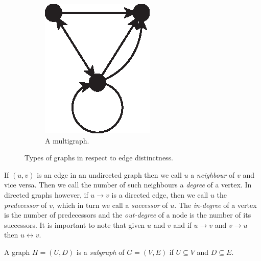 \begin{figure}[H]
\begin{subfigure}[b]{0.25\textwidth}
            \includegraphics[width=\textwidth]{chapters/02_problem_definition/graph_multi}
            \caption{A multigraph.}
            \label{fig:graphs_orientation_directed}
          \end{subfigure}
        \caption{Types of graphs in respect to edge distinctness.}
        \label{fig:graphs_orientation}
      \end{figure}

      If $(u, v)$ is an edge in an undirected graph then we call $u$ a \emph{neighbour} of $v$ and vice versa. Then we call the number of such neighbours a \emph{degree} of a vertex. In directed graphs however, if $u \rightarrow v$ is a directed edge, then we call $u$ the \emph{predecessor} of $v$, which in turn we call a \emph{successor} of $u$. The \emph{in-degree} of a vertex is the number of predecessors and the \emph{out-degree} of a node is the number of its successors. It is important to note that given $u$ and $v$ and if $u \rightarrow v$ and $v \rightarrow u$ then $u \leftrightarrow v$.

      A graph $H = (U, D)$ is a \emph{subgraph} of $G = (V, E)$ if $U \subseteq V$ and $D \subseteq E$.

